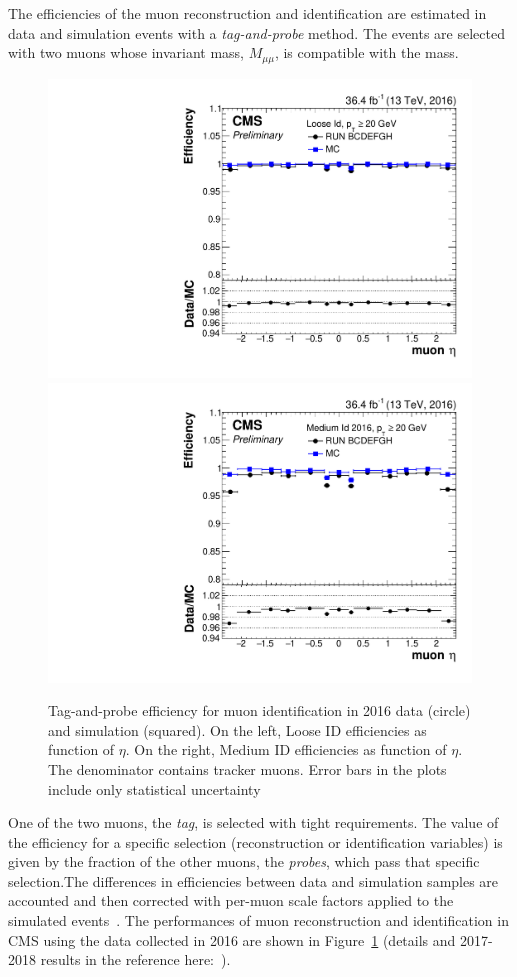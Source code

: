 The efficiencies of the muon reconstruction and identification are
estimated in data and simulation events with a \emph{tag-and-probe}
method. The events are selected with two muons whose invariant mass,
$M_{\mu \mu}$, is compatible with the \PZ mass. 
\begin{figure}[h!]
\centering
\includegraphics[width=.49\textwidth]{Figures/c2/TnP_MC_NUM_LooseID_DEN_genTracks_PAR_eta_.pdf}
\includegraphics[width=.49\textwidth]{Figures/c2/TnP_MC_NUM_MediumID2016_DEN_genTracks_PAR_eta_.pdf}
\caption{Tag-and-probe efficiency for muon identification in 2016 data
  (circle) and simulation (squared). On the left, Loose ID efficiencies as function of $\eta$. 
On the right, Medium ID efficiencies as function of $\eta$. The
  denominator contains tracker muons. Error bars in the plots include only statistical uncertainty~\cite{CMS-DP-2017-007}}
\label{fig:2016eff}
\end{figure}
One of the two muons,
the \emph{tag}, is selected with tight requirements. The value of the
efficiency for a specific selection (reconstruction or identification
variables) is given by the fraction of the other muons, the
\emph{probes}, which pass that specific selection.The differences in
efficiencies between data and simulation samples are accounted and
then corrected with per-muon scale factors applied to the simulated
events~\cite{Sirunyan_2018_muon}. The performances of muon
reconstruction and identification in CMS using the data collected in
2016 are shown in Figure~\ref{fig:2016eff} (details and 2017-2018
results in the reference
here:~\cite{CMS-DP-2017-007,CMS-DP-2018-042}).

